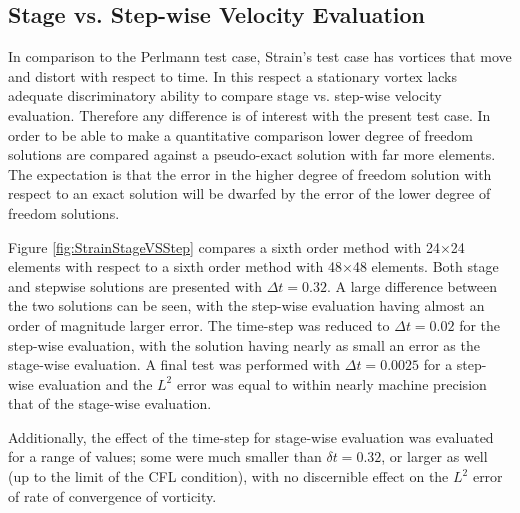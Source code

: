 \documentclass[letterpaper,12pt]{report}
\begin{document}
%
\subsection{Stage vs. Step-wise Velocity Evaluation}\label{SvsS}
In comparison to the Perlmann test case, Strain's test case has vortices that move and distort with respect to time. In this respect a stationary vortex lacks adequate discriminatory ability to compare stage vs. step-wise velocity evaluation. Therefore any difference is of interest with the present test case. In order to be able to make a quantitative comparison lower degree of freedom solutions are compared against a pseudo-exact solution with far more elements. The expectation is that the error in the higher degree of freedom solution with respect to an exact solution will be dwarfed by the error of the lower degree of freedom solutions.

Figure \ref{fig:StrainStageVSStep} compares a sixth order method with 24$\times$24 elements with respect to a sixth order method with 48$\times$48 elements. Both stage and stepwise solutions are presented with $\Delta t=0.32$. A large difference between the two solutions can be seen, with the step-wise evaluation having almost an order of magnitude larger error. The time-step was reduced to $\Delta t=0.02$ for the step-wise evaluation, with the solution having nearly as small an error as the stage-wise evaluation. A final test was performed with $\Delta t=0.0025$ for a step-wise evaluation and the $L^2$ error was equal to within nearly machine precision that of the stage-wise evaluation.

Additionally, the effect of the time-step for stage-wise evaluation was evaluated for a range of values; some were much smaller than $\delta t=0.32$, or larger as well (up to the limit of the CFL condition), with no discernible effect on the $L^2$ error of rate of convergence of vorticity.
\end{document}
